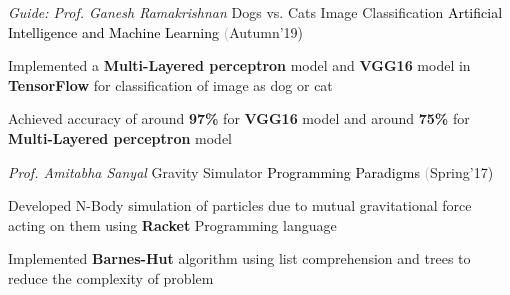\begin{cventries}
  \cventry
    {\textit{Guide: Prof. Ganesh Ramakrishnan}}
    {Dogs vs. Cats Image Classification}
    {\textcolor{black} {Artificial Intelligence and Machine Learning}}
    {\fontsize{9pt}{1em} \textcolor{darkgray}(Autumn'19)}
    {
      \begin{cvitems}
        \item Implemented a \textbf{Multi-Layered perceptron} model and \textbf{VGG16} model in \textbf{TensorFlow} for classification of image as dog or cat \vspace{0.3mm}
        \item Achieved accuracy of around \textbf{97\%} for \textbf{VGG16} model and around \textbf{75\%} for \textbf{Multi-Layered perceptron} model 
      \end{cvitems}
    }
  \cventry
    {\textit{Prof. Amitabha Sanyal}}
    {Gravity Simulator}
    {\textcolor{black} {Programming Paradigms}}
    {\fontsize{9pt}{1em} \textcolor{darkgray}(Spring'17)}
    {
      \begin{cvitems}
        \item Developed N-Body simulation of particles due to mutual gravitational force acting on them using \textbf{Racket} Programming language\vspace{0.3mm}
        \item Implemented \textbf{Barnes-Hut} algorithm using list comprehension and trees to reduce the complexity of problem
      \end{cvitems}
    }
\end{cventries}
